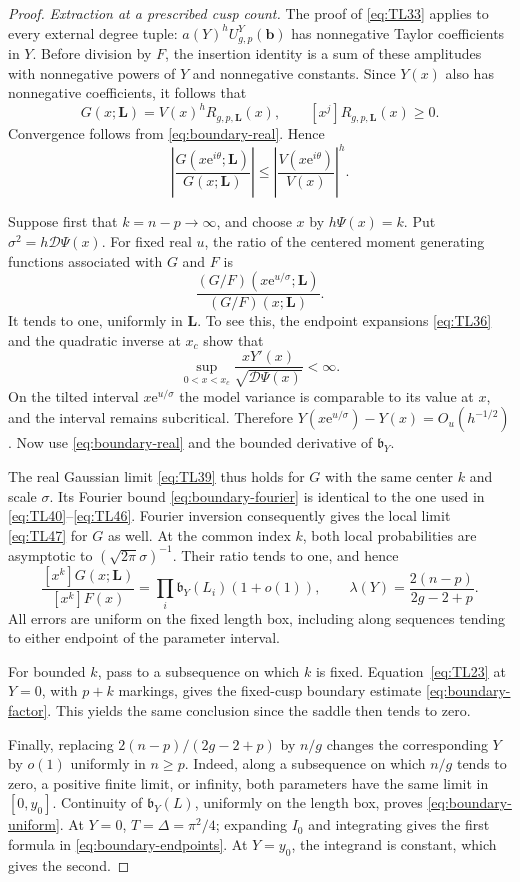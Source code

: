 \begin{proof}
\emph{Extraction at a prescribed cusp count.}
The proof of \eqref{eq:TL33} applies to every external degree tuple:
$a(Y)^hU^Y_{g,p}(\mathbf b)$ has nonnegative Taylor coefficients in $Y$.
Before division by $F$, the insertion identity is a sum of these
amplitudes with nonnegative powers of $Y$ and nonnegative constants.
Since $Y(x)$ also has nonnegative coefficients, it follows that
\[
 G(x;\mathbf L)=V(x)^h R_{g,p,\mathbf L}(x),\qquad
 [x^j]R_{g,p,\mathbf L}(x)\ge0.
\]
Convergence follows from \eqref{eq:boundary-real}. Hence
\begin{equation}
 \left|\frac{G(x\mathrm e^{i\theta};\mathbf L)}{G(x;\mathbf L)}\right|
 \le\left|\frac{V(x\mathrm e^{i\theta})}{V(x)}\right|^h.
 \label{eq:boundary-fourier}
\end{equation}

Suppose first that $k=n-p\to\infty$, and choose $x$ by
$h\Psi(x)=k$. Put $\sigma^2=h\mathscr D\Psi(x)$. For fixed real $u$,
the ratio of the centered moment generating functions associated with
$G$ and $F$ is
\[
 \frac{(G/F)(x\mathrm e^{u/\sigma};\mathbf L)}
 {(G/F)(x;\mathbf L)}.
\]
It tends to one, uniformly in $\mathbf L$. To see this, the endpoint
expansions \eqref{eq:TL36} and the quadratic inverse at $x_c$ show that
\[
 \sup_{0<x<x_c}\frac{xY'(x)}{\sqrt{\mathscr D\Psi(x)}}<\infty.
\]
On the tilted interval $x\mathrm e^{u/\sigma}$ the model variance is
comparable to its value at $x$, and the interval remains subcritical.
Therefore $Y(x\mathrm e^{u/\sigma})-Y(x)=O_u(h^{-1/2})$.
Now use \eqref{eq:boundary-real} and the bounded derivative of
$\mathfrak b_Y$.

The real Gaussian limit \eqref{eq:TL39} thus holds for $G$ with the same
center $k$ and scale $\sigma$. Its Fourier bound
\eqref{eq:boundary-fourier} is identical to the one used in
\eqref{eq:TL40}--\eqref{eq:TL46}. Fourier inversion consequently gives
the local limit \eqref{eq:TL47} for $G$ as well. At the common index
$k$, both local probabilities are asymptotic to
$(\sqrt{2\pi}\sigma)^{-1}$. Their ratio tends to one, and hence
\[
 \frac{[x^k]G(x;\mathbf L)}{[x^k]F(x)}
 =\prod_i\mathfrak b_{Y}(L_i)(1+o(1)),\qquad
 \lambda(Y)=\frac{2(n-p)}{2g-2+p}.
\]
All errors are uniform on the fixed length box, including along
sequences tending to either endpoint of the parameter interval.

For bounded $k$, pass to a subsequence on which $k$ is fixed.
Equation~\eqref{eq:TL23} at $Y=0$, with $p+k$ markings, gives the
fixed-cusp boundary estimate \eqref{eq:boundary-factor}. This yields the
same conclusion since the saddle then tends to zero.

Finally, replacing $2(n-p)/(2g-2+p)$ by $n/g$ changes the corresponding
$Y$ by $o(1)$ uniformly in $n\ge p$. Indeed, along a subsequence on
which $n/g$ tends to zero, a positive finite limit, or infinity, both
parameters have the same limit in $[0,y_0]$. Continuity of
$\mathfrak b_Y(L)$, uniformly on the length box, proves
\eqref{eq:boundary-uniform}. At $Y=0$, $T=\Delta=\pi^2/4$;
expanding $I_0$ and integrating gives the first formula in
\eqref{eq:boundary-endpoints}. At $Y=y_0$, the integrand is constant,
which gives the second.
\end{proof}
